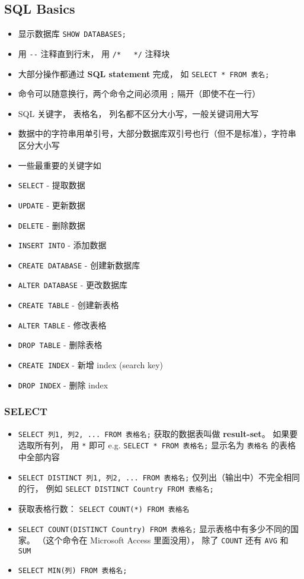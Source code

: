 \subsection{SQL Basics}
\begin{itemize}
\item 显示数据库 \verb`SHOW DATABASES;`
\item 用 \verb`--` 注释直到行末， 用 \verb`/*   */` 注释块
\item 大部分操作都通过 \textbf{SQL statement} 完成， 如 \verb`SELECT * FROM 表名;`
\item 命令可以随意换行，两个命令之间必须用 \verb`;` 隔开（即使不在一行）
\item SQL 关键字， 表格名， 列名都不区分大小写，一般关键词用大写
\item 数据中的字符串用单引号，大部分数据库双引号也行（但不是标准），字符串区分大小写
\item 一些最重要的关键字如
\item \verb`SELECT` - 提取数据
\item \verb`UPDATE` - 更新数据
\item \verb`DELETE` - 删除数据
\item \verb`INSERT INTO` - 添加数据
\item \verb`CREATE DATABASE` - 创建新数据库
\item \verb`ALTER DATABASE` - 更改数据库
\item \verb`CREATE TABLE` - 创建新表格
\item \verb`ALTER TABLE` - 修改表格
\item \verb`DROP TABLE` - 删除表格
\item \verb`CREATE INDEX` - 新增 index (search key)
\item \verb`DROP INDEX` - 删除 index
\end{itemize}

\subsubsection{SELECT}
\begin{itemize}
\item \verb`SELECT 列1, 列2, ... FROM 表格名;` 获取的数据表叫做 \textbf{result-set}。 如果要选取所有列， 用 \verb`*` 即可 e.g. \verb`SELECT * FROM 表格名;` 显示名为 \verb`表格名` 的表格中全部内容
\item \verb`SELECT DISTINCT 列1, 列2, ... FROM 表格名;` 仅列出（输出中）不完全相同的行， 例如 \verb`SELECT DISTINCT Country FROM 表格名;`
\item 获取表格行数： \verb`SELECT COUNT(*) FROM 表格名`
\item \verb`SELECT COUNT(DISTINCT Country) FROM 表格名;` 显示表格中有多少不同的国家。 （这个命令在 Microsoft Access 里面没用）， 除了 \verb`COUNT` 还有 \verb`AVG` 和 \verb`SUM`
\item \verb`SELECT MIN(列) FROM 表格名;`
\end{itemize}


